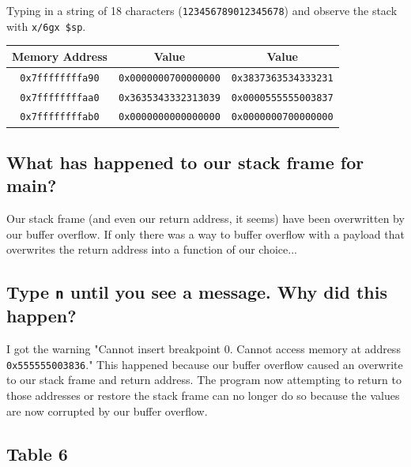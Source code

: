 \documentclass[12pt, letterpaper]{article}
\begin{document}
Typing in a string of 18 characters (\texttt{123456789012345678}) and observe the stack with \texttt{x/6gx \$sp}.

\begin{table}[h]
    \begin{center}
        \begin{tabular}{|c|c|c|}
            \hline
            \textbf{Memory Address} & \textbf{Value} & \textbf{Value} \\
            \hline
            \texttt{0x7ffffffffa90} & \texttt{0x0000000700000000} & \texttt{0x3837363534333231} \\
            \hline
            \texttt{0x7ffffffffaa0} & \texttt{0x3635343332313039} & \texttt{0x0000555555003837} \\
            \hline
            \texttt{0x7ffffffffab0} & \texttt{0x0000000000000000} & \texttt{0x0000000700000000} \\
            \hline
        \end{tabular}
    \end{center}
\end{table}
\FloatBarrier

\subsection*{What has happened to our stack frame for main?}

Our stack frame (and even our return address, it seems) have been overwritten by our buffer overflow. If only there was a way to buffer overflow with a payload that overwrites the return address into a function of our choice...

\subsection*{Type \texttt{n} until you see a message. Why did this happen?}

I got the warning "Cannot insert breakpoint 0. Cannot access memory at address \texttt{0x555555003836}." This happened because our buffer overflow caused an overwrite to our stack frame and return address. The program now attempting to return to those addresses or restore the stack frame can no longer do so because the values are now corrupted by our buffer overflow.

\subsection*{Table 6}
\end{document}
